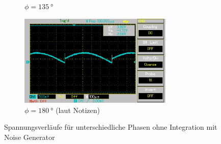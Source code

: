 \begin{figure}[H]
\begin{subfigure}{0.5\textwidth}
    \caption{$\phi = \qty[]{135}{\degree}$}%
    \label{fig:phase9}%
    \end{subfigure}%
    \hfill
    \begin{subfigure}{0.5\textwidth}%
    \centering%
    \includegraphics[width = 7.3cm]{./Oszilloskop Bilder/png/5.3/n5.png}%
    \caption{$\phi = \qty[]{180}{\degree}$ (laut Notizen)}%
    \label{fig:phase10}%
    \end{subfigure}%
    \caption{Spannungsverläufe für unterschiedliche Phasen ohne Integration mit Noise Generator}%
    \label{fig:phasenunterschiede_mit_noise}%
\end{figure}%


